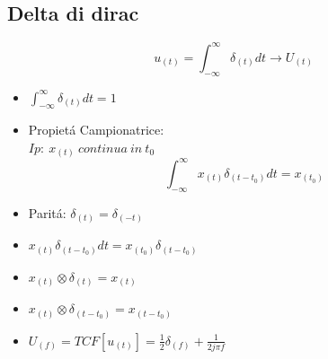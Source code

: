     \subsection{Delta di dirac}
        \[
            u_{(t)} = \int_{-\infty}^{\infty} \delta_{(t)} dt \rightarrow U_{(t)}
        \]
        \begin{itemize}
            \item {
                $\int_{-\infty}^{\infty} \delta_{(t)} dt = 1$
            }
            \item {
                Propietá Campionatrice:\\
                $Ip:\ x_{(t)}\ continua\ in\ t_0$
                \[
                    \int_{-\infty}^{\infty}x_{(t)}\delta_{(t-t_0)} dt = x_{(t_0)}  
                \]
            }
            \item {
                Paritá: $\delta_{(t)} = \delta_{(-t)}$
            }
            \item {
                $x_{(t)}\delta_{(t-t_0)} dt = x_{(t_0)}\delta_{(t-t_0)}$
            }
            \item {
                $x_{(t)} \otimes \delta_{(t)} = x_{(t)}$
            }
            \item {
                $x_{(t)} \otimes \delta_{(t-t_0)} = x_{(t-t_0)}$
            }
            \item {
                $U_{(f)} = TCF[u_{(t)}] = \frac{1}{2}\delta_{(f)}+\frac{1}{2j\pi f}$
            }
        \end{itemize}
